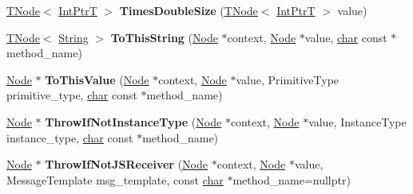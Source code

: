 \begin{DoxyCompactItemize}
\item 
\mbox{\label{classv8_1_1internal_1_1CodeStubAssembler_a12c02e94316a77121714b958c0f0f286}} 
\mbox{\hyperlink{classv8_1_1internal_1_1compiler_1_1TNode}{T\+Node}}$<$ \mbox{\hyperlink{structv8_1_1internal_1_1IntPtrT}{Int\+PtrT}} $>$ {\bfseries Times\+Double\+Size} (\mbox{\hyperlink{classv8_1_1internal_1_1compiler_1_1TNode}{T\+Node}}$<$ \mbox{\hyperlink{structv8_1_1internal_1_1IntPtrT}{Int\+PtrT}} $>$ value)
\item 
\mbox{\label{classv8_1_1internal_1_1CodeStubAssembler_a9c94ba54fd3355e9a0cd43923edb70cc}} 
\mbox{\hyperlink{classv8_1_1internal_1_1compiler_1_1TNode}{T\+Node}}$<$ \mbox{\hyperlink{classv8_1_1internal_1_1String}{String}} $>$ {\bfseries To\+This\+String} (\mbox{\hyperlink{classv8_1_1internal_1_1compiler_1_1Node}{Node}} $\ast$context, \mbox{\hyperlink{classv8_1_1internal_1_1compiler_1_1Node}{Node}} $\ast$value, \mbox{\hyperlink{classchar}{char}} const $\ast$method\+\_\+name)
\item 
\mbox{\label{classv8_1_1internal_1_1CodeStubAssembler_af12984fcba80bc886c3da3f66abd59ef}} 
\mbox{\hyperlink{classv8_1_1internal_1_1compiler_1_1Node}{Node}} $\ast$ {\bfseries To\+This\+Value} (\mbox{\hyperlink{classv8_1_1internal_1_1compiler_1_1Node}{Node}} $\ast$context, \mbox{\hyperlink{classv8_1_1internal_1_1compiler_1_1Node}{Node}} $\ast$value, Primitive\+Type primitive\+\_\+type, \mbox{\hyperlink{classchar}{char}} const $\ast$method\+\_\+name)
\item 
\mbox{\label{classv8_1_1internal_1_1CodeStubAssembler_a23927dd7774a5c32cb0a1ea27027aad0}} 
\mbox{\hyperlink{classv8_1_1internal_1_1compiler_1_1Node}{Node}} $\ast$ {\bfseries Throw\+If\+Not\+Instance\+Type} (\mbox{\hyperlink{classv8_1_1internal_1_1compiler_1_1Node}{Node}} $\ast$context, \mbox{\hyperlink{classv8_1_1internal_1_1compiler_1_1Node}{Node}} $\ast$value, Instance\+Type instance\+\_\+type, \mbox{\hyperlink{classchar}{char}} const $\ast$method\+\_\+name)
\item 
\mbox{\label{classv8_1_1internal_1_1CodeStubAssembler_a82fb099779086826fb40d8bd3906946d}} 
\mbox{\hyperlink{classv8_1_1internal_1_1compiler_1_1Node}{Node}} $\ast$ {\bfseries Throw\+If\+Not\+J\+S\+Receiver} (\mbox{\hyperlink{classv8_1_1internal_1_1compiler_1_1Node}{Node}} $\ast$context, \mbox{\hyperlink{classv8_1_1internal_1_1compiler_1_1Node}{Node}} $\ast$value, Message\+Template msg\+\_\+template, const \mbox{\hyperlink{classchar}{char}} $\ast$method\+\_\+name=nullptr)

\end{DoxyCompactItemize}
